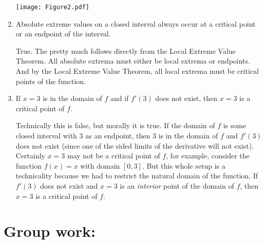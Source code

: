 \documentclass[handout,nooutcomes]{ximera}
\begin{document}
\begin{enumerate}
\begin{freeResponse}
		\begin{image}
		\texttt{[image: Figure2.pdf]}
		\end{image}
		
		\end{freeResponse}	
		
		
		
	\item  Absolute extreme values on a closed interval always occur at a critical point or an endpoint of the interval.
		\begin{freeResponse}
		True.  The pretty much follows directly from the Local Extreme Value Theorem.  All absolute extrema must either be local extrema or endpoints.  And by the Local Extreme Value Theorem, all local extrema must be critical points of the function.  
		\end{freeResponse}	
		
		
		
	\item  If $x=3$ is in the domain of $f$ and if $f'(3)$ does not exist, then $x=3$ is a critical point of $f$.
		\begin{freeResponse}
		Technically this is false, but morally it is true.  If the domain of $f$ is some closed interval with $3$ as an endpoint, then $3$ is in the domain of $f$ and $f'(3)$ does not exist (since one of the sided limits of the derivative will not exist).  Certainly $x=3$ may not be a critical point of $f$, for example, consider the function $f(x) = x$ with domain $[0,3]$.  But this whole setup is a technicality because we had to restrict the natural domain of the function.  If $f'(3)$ does not exist and $x=3$ is an \emph{interior} point of the domain of $f$, then $x=3$ is a critical point of $f$.  
		\end{freeResponse}	
		
		
		
	\end{enumerate}
		
		
		

	
	
	
	
	

\section*{Group work:}
\end{document}
